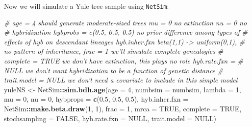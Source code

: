 \documentclass[]{article}
\newenvironment{Shaded}{\begin{snugshade}}{\end{snugshade}}
\newcommand{\KeywordTok}[1]{\textcolor[rgb]{0.13,0.29,0.53}{\textbf{#1}}}
\newcommand{\DataTypeTok}[1]{\textcolor[rgb]{0.13,0.29,0.53}{#1}}
\newcommand{\DecValTok}[1]{\textcolor[rgb]{0.00,0.00,0.81}{#1}}
\newcommand{\FloatTok}[1]{\textcolor[rgb]{0.00,0.00,0.81}{#1}}
\newcommand{\StringTok}[1]{\textcolor[rgb]{0.31,0.60,0.02}{#1}}
\newcommand{\CommentTok}[1]{\textcolor[rgb]{0.56,0.35,0.01}{\textit{#1}}}
\newcommand{\OtherTok}[1]{\textcolor[rgb]{0.56,0.35,0.01}{#1}}
\newcommand{\OperatorTok}[1]{\textcolor[rgb]{0.81,0.36,0.00}{\textbf{#1}}}
\newcommand{\NormalTok}[1]{#1}
\begin{document}
Now we will simulate a Yule tree sample using \texttt{NetSim}:

\begin{Shaded}
\begin{Highlighting}[]
\CommentTok{# age = 4 should generate moderate-sized trees mu = 0 no extinction nu = 0 no}
\CommentTok{# hybridization hybprobs = c(0.5, 0.5, 0.5) no prior difference among types of}
\CommentTok{# effects of hyb on descendant lineages hyb.inher.fxn beta(1,1) -> uniform(0,1),}
\CommentTok{# no pattern of inheritance, frac = 1 we'll simulate complete genealogies}
\CommentTok{# complete = TRUE we don't have extinction, this plays no role hyb.rate.fxn =}
\CommentTok{# NULL we don't want hybridization to be a function of genetic distance}
\CommentTok{# trait.model = NULL we don't need a covariate to include in this simple model}
\NormalTok{yuleNS <-}\StringTok{ }\NormalTok{NetSim}\OperatorTok{::}\KeywordTok{sim.bdh.age}\NormalTok{(}\DataTypeTok{age =} \DecValTok{4}\NormalTok{, }\DataTypeTok{numbsim =}\NormalTok{ numbsim, }\DataTypeTok{lambda =} \DecValTok{1}\NormalTok{, }\DataTypeTok{mu =} \DecValTok{0}\NormalTok{, }\DataTypeTok{nu =} \DecValTok{0}\NormalTok{, }
    \DataTypeTok{hybprops =} \KeywordTok{c}\NormalTok{(}\FloatTok{0.5}\NormalTok{, }\FloatTok{0.5}\NormalTok{, }\FloatTok{0.5}\NormalTok{), }\DataTypeTok{hyb.inher.fxn =}\NormalTok{ NetSim}\OperatorTok{::}\KeywordTok{make.beta.draw}\NormalTok{(}\DecValTok{1}\NormalTok{, }\DecValTok{1}\NormalTok{), }\DataTypeTok{frac =} \DecValTok{1}\NormalTok{, }
    \DataTypeTok{mrca =} \OtherTok{TRUE}\NormalTok{, }\DataTypeTok{complete =} \OtherTok{TRUE}\NormalTok{, }\DataTypeTok{stochsampling =} \OtherTok{FALSE}\NormalTok{, }\DataTypeTok{hyb.rate.fxn =} \OtherTok{NULL}\NormalTok{, }\DataTypeTok{trait.model =} \OtherTok{NULL}\NormalTok{)}


\end{Highlighting}
\end{Shaded}
\end{document}
